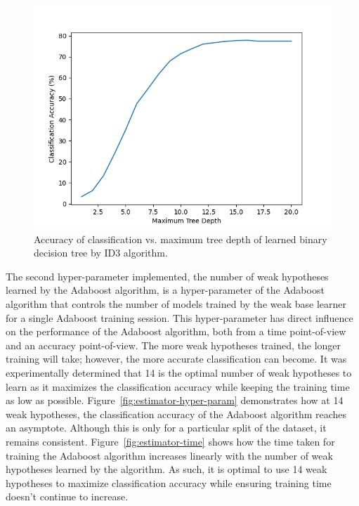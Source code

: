\documentclass[a4paper]{article}
\begin{document}
\begin{figure}[h]
    \centering
    \includegraphics[scale=0.7]{images/tree-depth-plot.png}
    \caption{Accuracy of classification vs. maximum tree depth of learned binary decision tree by ID3 algorithm.}
    \label{fig:depth-hyper-param}
\end{figure}

The second hyper-parameter implemented, the number of weak hypotheses learned by the Adaboost algorithm, is a hyper-parameter of the Adaboost algorithm that controls the number of models trained by the weak base learner for a single Adaboost training session. This hyper-parameter has direct influence on the performance of the Adaboost algorithm, both from a time point-of-view and an accuracy point-of-view. The more weak hypotheses trained, the longer training will take; however, the more accurate classification can become. It was experimentally determined that 14 is the optimal number of weak hypotheses to learn as it maximizes the classification accuracy while keeping the training time as low as possible. Figure~\ref{fig:estimator-hyper-param} demonstrates how at 14 weak hypotheses, the classification accuracy of the Adaboost algorithm reaches an asymptote. Although this is only for a particular split of the dataset, it remains consistent. Figure~\ref{fig:estimator-time} shows how the time taken for training the Adaboost algorithm increases linearly with the number of weak hypotheses learned by the algorithm. As such, it is optimal to use 14 weak hypotheses to maximize classification accuracy while ensuring training time doesn't continue to increase.
\end{document}
